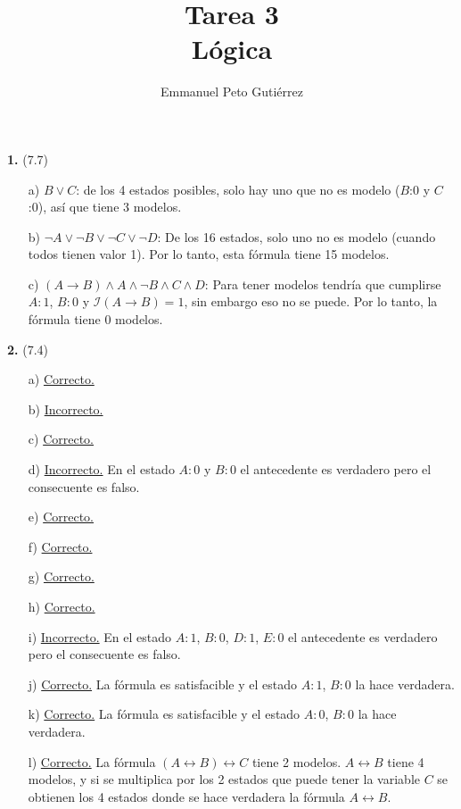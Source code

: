 \documentclass{article}
\title{Tarea 3\\Lógica}
\author{Emmanuel Peto Gutiérrez}
\begin{document}
\maketitle

\textbf{1.} (7.7)

\begin{itemize}
\item[a)] $B \lor C$: de los 4 estados posibles, solo hay uno que no es modelo ($B$:0 y $C$:0), así que tiene 3 modelos.
\item[b)] $\lnot A \lor \lnot B \lor \lnot C \lor \lnot D$: De los 16 estados, solo uno no es modelo (cuando todos tienen valor 1). Por lo tanto, esta fórmula tiene 15 modelos.
\item[c)] $(A \rightarrow B) \land A \land \lnot B \land C \land D$: Para tener modelos tendría que cumplirse $A:1$, $B:0$ y $\mathcal{I} (A \rightarrow B) = 1$, sin embargo eso no se puede. Por lo tanto, la fórmula tiene 0 modelos.
\end{itemize}

\textbf{2.} (7.4)

\begin{itemize}
\item[a)] \underline{Correcto.}
\item[b)] \underline{Incorrecto.}
\item[c)] \underline{Correcto.}
\item[d)] \underline{Incorrecto.} En el estado $A:0$ y $B:0$ el antecedente es verdadero pero el consecuente es falso.
\item[e)] \underline{Correcto.}
\item[f)] \underline{Correcto.}
\item[g)] \underline{Correcto.}
\item[h)] \underline{Correcto.}
\item[i)] \underline{Incorrecto.}  En el estado $A:1$, $B:0$, $D:1$, $E:0$ el antecedente es verdadero pero el consecuente es falso.
\item[j)] \underline{Correcto.} La fórmula es satisfacible y el estado $A:1$, $B:0$ la hace verdadera.
\item[k)] \underline{Correcto.} La fórmula es satisfacible y el estado $A:0$, $B:0$ la hace verdadera.
\item[l)] \underline{Correcto.} La fórmula $(A \leftrightarrow B) \leftrightarrow C$ tiene 2 modelos. $A \leftrightarrow B$ tiene 4 modelos, y si se multiplica por los 2 estados que puede tener la variable $C$ se obtienen los 4 estados donde se hace verdadera la fórmula $A \leftrightarrow B$.
\end{itemize}
\end{document}
